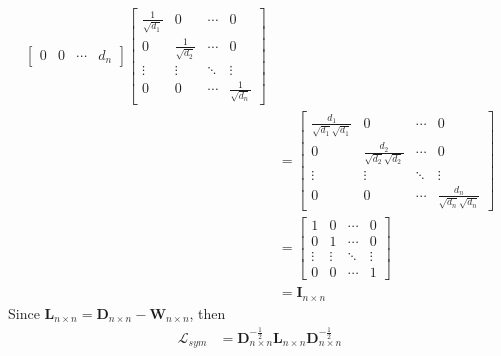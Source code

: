 \documentclass[oneside]{book}
\begin{document}
{{\begin{align}
\begin{bmatrix}
                        0      & 0      & \cdots & d_{n}
                    \end{bmatrix}
                    \begin{bmatrix}
                        \frac{1}{\sqrt{d_{1}}} & 0                      & \cdots & 0\\
                        0                      & \frac{1}{\sqrt{d_{2}}} & \cdots & 0\\
                        \vdots                 & \vdots                 & \ddots & \vdots\\
                        0                      & 0                      & \cdots & \frac{1}{\sqrt{d_{n}}}
                    \end{bmatrix}\\
                    &=
                    \begin{bmatrix}
                        \frac{d_{1}}{\sqrt{d_{1}}\sqrt{d_{1}}} & 0                                    & \cdots & 0\\
                        0                                      & \frac{d_{2}}{\sqrt{d_{2}}\sqrt{d_{2}}} & \cdots & 0\\
                        \vdots                                 & \vdots                               & \ddots & \vdots\\
                        0                                      & 0                                    & \cdots & \frac{d_{n}}{\sqrt{d_{n}}\sqrt{d_{n}}}
                    \end{bmatrix}\\
                    &=
                    \begin{bmatrix}
                        1      & 0      & \cdots & 0\\
                        0      & 1      & \cdots & 0\\
                        \vdots & \vdots & \ddots & \vdots\\
                        0      & 0      & \cdots & 1
                    \end{bmatrix}\\
                    &=
                    \mathbf{I}_{n \times n}
        \end{align}
        Since $\mathbf{L}_{n \times n}=\mathbf{D}_{n \times n}-\mathbf{W}_{n \times n}$, then
        \begin{align}
            \mathcal{L}_{sym}
                &=\mathbf{D}_{n \times n}^{-\frac{1}{2}}\mathbf{L}_{n \times n}\mathbf{D}_{n \times n}^{-\frac{1}{2}}\\

\end{align}}}
\end{document}
